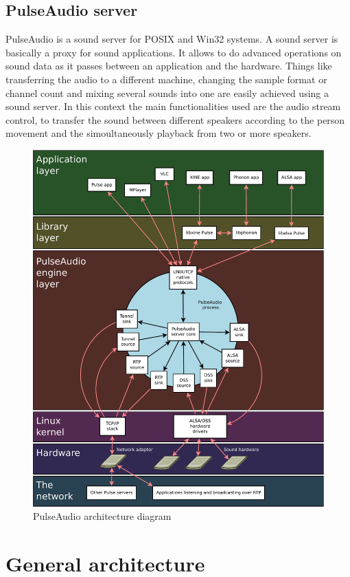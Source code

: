 \documentclass[conference]{IEEEtran}
\begin{document}
\subsection{PulseAudio server}
PulseAudio is a sound server for POSIX and Win32 systems. A sound server is basically a proxy for sound applications. It allows to do advanced operations on sound data as it passes between an application and the hardware. Things like transferring the audio to a different machine, changing the sample format or channel count and mixing several sounds into one are easily achieved using a sound server. In this context the main functionalities used are the audio stream control, to transfer the sound between different speakers according to the person movement and the simoultaneously playback from two or more speakers.

\begin{figure}
\centering
\includegraphics[width=\columnwidth]{PulseAudio}
\caption{PulseAudio architecture diagram}
\end{figure}

\section{General architecture}
\end{document}
